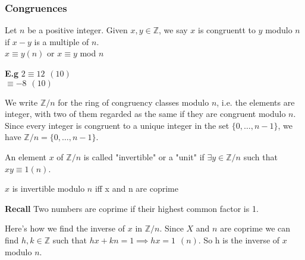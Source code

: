 \documentclass[11pt]{article}
\begin{document}
	\subsubsection{Congruences}
	Let $n$ be a positive integer. Given $x,y \in \mathbb{Z}$, we say $x$ is congruentt to $y$ modulo $n$ if $x-y$ is a multiple of $n$.\\

	$x \equiv y (n)$  \hspace{10pt} or \hspace{10pt} $x \equiv y$ mod $n$
	
	\begin{flushleft}
		\textbf{E.g} \hspace{10pt} $2 \equiv 12 \hspace{5pt} (10)$\\
		\hspace{42pt}$\equiv  -8 \hspace{5pt} (10)$
	\end{flushleft}
	

	We write $\mathbb{Z}/n$ for the ring of congruency classes modulo $n$, i.e. the elements are integer, with two of them regarded as the same if they are congruent modulo $n$.\\

	Since every integer is congruent to a unique integer in the set $\{0,\dots, n-1\}$, we have $\mathbb{Z}/n = \{0,\dots, n-1\}$.

	An element $x$ of $\mathbb{Z}/n $ is called "invertible" or a "unit" if $\exists y \in \mathbb{Z}/n$ such that $xy \equiv 1 (n)$.

	\begin{theorem}
$x$ is invertible modulo $n$ iff x and n are coprime
	\end{theorem}
	\textbf{Recall} Two numbers are coprime if their highest common factor is 1.

	Here's how we find the inverse of $x$ in $\mathbb{Z}/n$. Since $X$ and $n$ are coprime we can find $h, k \in \mathbb{Z}$ such that $hx+kn = 1 \implies hx = 1 \hspace{5pt} (n)$. So h is the inverse of $x$ modulo $n$.
\end{document}
